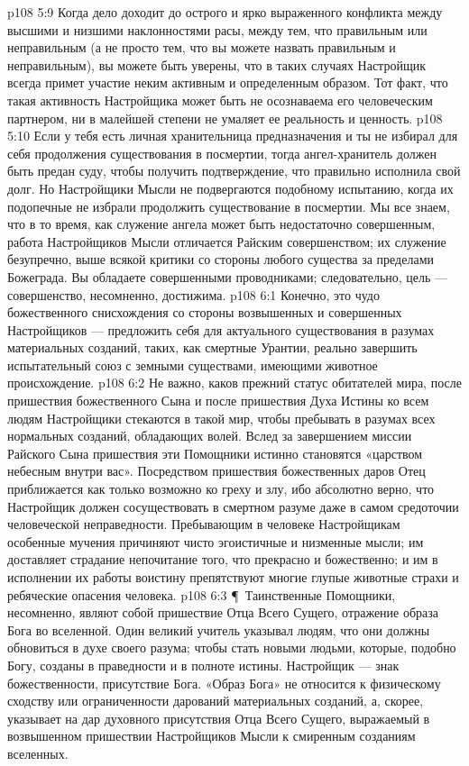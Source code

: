\vs p108 5:9 Когда дело доходит до острого и ярко выраженного конфликта между высшими и низшими наклонностями расы, между тем, что  правильным или неправильным (а не просто тем, что вы можете назвать правильным и неправильным), вы можете быть уверены, что в таких случаях Настройщик всегда примет участие неким активным и определенным образом. Тот факт, что такая активность Настройщика может быть не осознаваема его человеческим партнером, ни в малейшей степени не умаляет ее реальность и ценность.
\vs p108 5:10 Если у тебя есть личная хранительница предназначения и ты не избирал для себя продолжения существования в посмертии, тогда ангел\hyp{}хранитель должен быть предан суду, чтобы получить подтверждение, что правильно исполнила свой долг. Но Настройщики Мысли не подвергаются подобному испытанию, когда их подопечные не избрали продолжить существование в посмертии. Мы все знаем, что в то время, как служение ангела может быть недостаточно совершенным, работа Настройщиков Мысли отличается Райским совершенством; их служение безупречно, выше всякой критики со стороны любого существа за пределами Божеграда. Вы обладаете совершенными проводниками; следовательно, цель --- совершенство, несомненно, достижима.
\vs p108 6:1 Конечно, это чудо божественного снисхождения со стороны возвышенных и совершенных Настройщиков --- предложить себя для актуального существования в разумах материальных созданий, таких, как смертные Урантии, реально завершить испытательный союз с земными существами, имеющими животное происхождение.
\vs p108 6:2 Не важно, каков прежний статус обитателей мира, после пришествия божественного Сына и после пришествия Духа Истины ко всем людям Настройщики стекаются в такой мир, чтобы пребывать в разумах всех нормальных созданий, обладающих волей. Вслед за завершением миссии Райского Сына пришествия эти Помощники истинно становятся «царством небесным внутри вас». Посредством пришествия божественных даров Отец приближается как только возможно ко греху и злу, ибо абсолютно верно, что Настройщик должен сосуществовать в смертном разуме даже в самом средоточии человеческой неправедности. Пребывающим в человеке Настройщикам особенные мучения причиняют чисто эгоистичные и низменные мысли; им доставляет страдание непочитание того, что прекрасно и божественно; и им в исполнении их работы воистину препятствуют многие глупые животные страхи и ребяческие опасения человека.
\vs p108 6:3 \P\ Таинственные Помощники, несомненно, являют собой пришествие Отца Всего Сущего, отражение образа Бога во вселенной. Один великий учитель указывал людям, что они должны обновиться в духе своего разума; чтобы стать новыми людьми, которые, подобно Богу, созданы в праведности и в полноте истины. Настройщик --- знак божественности, присутствие Бога. «Образ Бога» не относится к физическому сходству или ограниченности дарований материальных созданий, а, скорее, указывает на дар духовного присутствия Отца Всего Сущего, выражаемый в возвышенном пришествии Настройщиков Мысли к смиренным созданиям вселенных.
